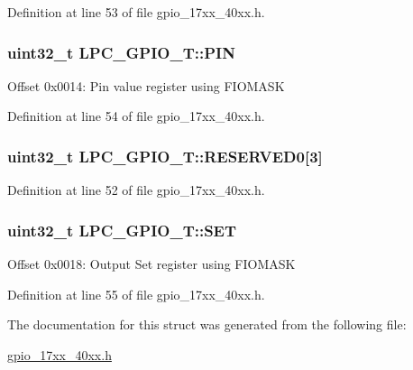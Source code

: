 Definition at line 53 of file gpio\+\_\+17xx\+\_\+40xx.\+h.

\subsubsection[{\texorpdfstring{P\+IN}{PIN}}]{ uint32\+\_\+t L\+P\+C\+\_\+\+G\+P\+I\+O\+\_\+\+T\+::\+P\+IN}\hypertarget{structLPC__GPIO__T_a1311cc8cf63279d1bdfca5d48c6ccf0a}{}\label{structLPC__GPIO__T_a1311cc8cf63279d1bdfca5d48c6ccf0a}
Offset 0x0014\+: Pin value register using F\+I\+O\+M\+A\+SK 

Definition at line 54 of file gpio\+\_\+17xx\+\_\+40xx.\+h.

\subsubsection[{\texorpdfstring{R\+E\+S\+E\+R\+V\+E\+D0}{RESERVED0}}]{\setlength{\rightskip}{0pt plus 5cm}uint32\+\_\+t L\+P\+C\+\_\+\+G\+P\+I\+O\+\_\+\+T\+::\+R\+E\+S\+E\+R\+V\+E\+D0\mbox{[}3\mbox{]}}\hypertarget{structLPC__GPIO__T_a292d7fd1269aebf1bf53d6df324319a3}{}\label{structLPC__GPIO__T_a292d7fd1269aebf1bf53d6df324319a3}


Definition at line 52 of file gpio\+\_\+17xx\+\_\+40xx.\+h.

\subsubsection[{\texorpdfstring{S\+ET}{SET}}]{ uint32\+\_\+t L\+P\+C\+\_\+\+G\+P\+I\+O\+\_\+\+T\+::\+S\+ET}\hypertarget{structLPC__GPIO__T_aaafd15e2c4eb4665f7a546dfeea25954}{}\label{structLPC__GPIO__T_aaafd15e2c4eb4665f7a546dfeea25954}
Offset 0x0018\+: Output Set register using F\+I\+O\+M\+A\+SK 

Definition at line 55 of file gpio\+\_\+17xx\+\_\+40xx.\+h.



The documentation for this struct was generated from the following file\+:\begin{DoxyCompactItemize}
\item 
\hyperlink{gpio__17xx__40xx_8h}{gpio\+\_\+17xx\+\_\+40xx.\+h}\end{DoxyCompactItemize}
